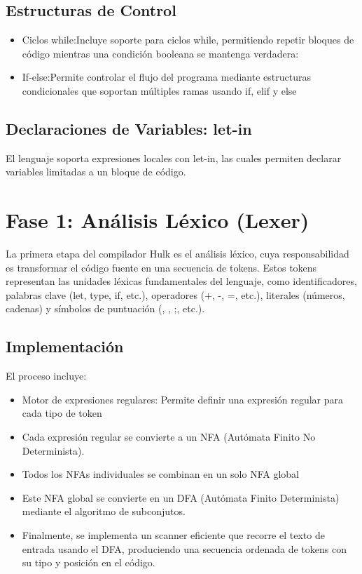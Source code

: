 \documentclass[a4paper,12pt]{article}
\begin{document}
\subsection{Estructuras de Control}
\begin{itemize}
	\item Ciclos while:Incluye soporte para ciclos while, permitiendo repetir bloques de código mientras una condición booleana se mantenga verdadera:
	\item If-else:Permite controlar el flujo del programa mediante estructuras condicionales que soportan múltiples ramas usando if, elif  y else
\end{itemize}

\subsection{ Declaraciones de Variables: let-in}
El lenguaje soporta expresiones locales con let-in, las cuales permiten declarar variables limitadas a un bloque de código.

\section{Fase 1: Análisis Léxico (Lexer)}

La primera etapa del compilador Hulk es el análisis léxico, cuya responsabilidad es transformar el código fuente en una secuencia de tokens. Estos tokens representan las unidades léxicas fundamentales del lenguaje, como identificadores, palabras clave (let, type, if, etc.), operadores (+, -, =, etc.), literales (números, cadenas) y símbolos de puntuación ({, }, ;, etc.).

\subsection{Implementación}
 El proceso incluye:
 \begin{itemize}
 	\item Motor de expresiones regulares: Permite definir una expresión regular para cada tipo de token
 	\item  Cada expresión regular se convierte a un NFA (Autómata Finito No Determinista).
 	\item Todos los NFAs individuales se combinan en un solo NFA global
 	\item Este NFA global se convierte en un DFA (Autómata Finito Determinista) mediante el algoritmo de subconjutos.
 	\item Finalmente, se implementa un scanner eficiente que recorre el texto de entrada usando el DFA, produciendo una secuencia ordenada de tokens con su tipo y posición en el código.
 \end{itemize}
\end{document}
